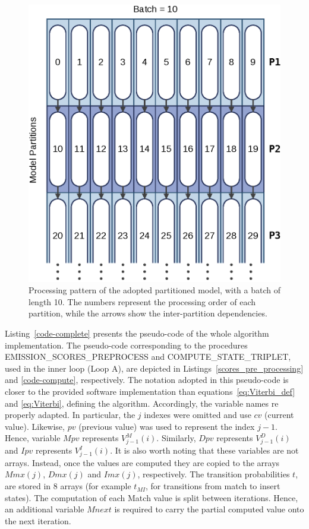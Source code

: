 \documentclass{bmcart}
\begin{document}
\begin{figure}[h!]
  \centering
  \includegraphics{img/partitions.eps} 
  \caption{Processing pattern of the adopted partitioned model, with a batch of length 10. The numbers represent the processing order of each partition, while the arrows show the inter-partition dependencies.}
  \label{figure-partitions}
\end{figure}

Listing~\ref{code-complete} presents the pseudo-code of the whole algorithm implementation. The pseudo-code corresponding to the procedures EMISSION\_SCORES\_PREPROCESS and COMPUTE\_STATE\_TRIPLET, used in the inner loop (Loop A), are depicted in Listings~\ref{scores_pre_processing} and \ref{code-compute}, respectively. The notation adopted in this pseudo-code is closer to the provided software implementation than equations~\ref{eq:Viterbi_def} and \ref{eq:Viterbi}, defining the algorithm. Accordingly, the variable names re properly adapted. In particular, the $j$ indexes were omitted and use $cv$ (current value). Likewise, $pv$ (previous value) was used to represent the index $j-1$. Hence, variable $Mpv$ represents  $V^M_{j-1} (i)$. Similarly, $Dpv$ represents $V^D_{j-1} (i)$ and $Ipv$ represents $V^I_{j-1} (i)$. 
It is also worth noting that these variables are not arrays. Instead, once the values are computed they are copied to the arrays $Mmx(j)$, $Dmx(j)$ and $Imx(j)$, respectively. The transition probabilities $t$, are stored in $8$ arrays (for example $t_{MI}$, for transitions from match to insert states). The computation of each Match value is split between iterations. Hence, an additional variable $Mnext$ is required to carry the partial computed value onto the next iteration.
\end{document}
